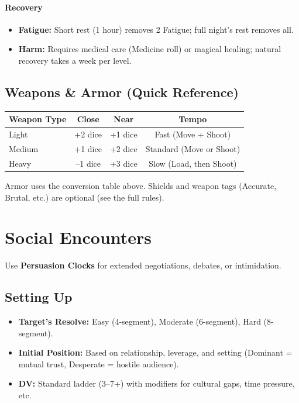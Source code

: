 \paragraph{Recovery}
\begin{itemize}[leftmargin=*]
  \item \textbf{Fatigue:} Short rest (1 hour) removes 2 Fatigue; full night's rest removes all.
  \item \textbf{Harm:} Requires medical care (Medicine roll) or magical healing; natural recovery takes a week per level.
\end{itemize}

\subsection{Weapons \& Armor (Quick Reference)}
\begin{center}
\begin{tabular}{lccc}
\toprule
\textbf{Weapon Type} & \textbf{Close} & \textbf{Near} & \textbf{Tempo} \\
\midrule
Light  & +2 dice & +1 dice & Fast (Move + Shoot) \\
Medium & +1 dice & +2 dice & Standard (Move or Shoot) \\
Heavy  & --1 dice & +3 dice & Slow (Load, then Shoot) \\
\bottomrule
\end{tabular}
\end{center}
Armor uses the conversion table above. Shields and weapon tags (Accurate, Brutal, etc.) are optional (see the full rules).

\section{Social Encounters}

Use \textbf{Persuasion Clocks} for extended negotiations, debates, or intimidation.

\subsection{Setting Up}
\begin{itemize}[leftmargin=*]
  \item \textbf{Target's Resolve:} Easy (4-segment), Moderate (6-segment), Hard (8-segment).
  \item \textbf{Initial Position:} Based on relationship, leverage, and setting (Dominant = mutual trust, Desperate = hostile audience).
  \item \textbf{DV:} Standard ladder (3--7+) with modifiers for cultural gaps, time pressure, etc.
\end{itemize}

